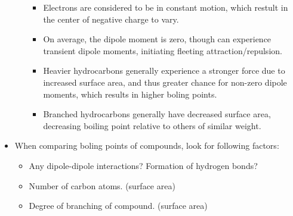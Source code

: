 \documentclass[12pt,a4paper]{article}
\begin{document}
\begin{itemize}
\begin{itemize}
                \begin{itemize}
                    \item Electrons are considered to be in constant motion, which restult in the center of negative charge to vary.
                    \item On average, the dipole moment is zero, though can experience transient dipole moments, initiating fleeting attraction/repulsion.
                    \item Heavier hydrocarbons generally experience a stronger force due to increased surface area, and thus greater chance for non-zero dipole moments, which results in higher boling points.
                    \item Branched hydrocarbons generally have decreased surface area, decreasing boiling point relative to others of similar weight.
                \end{itemize}
        \end{itemize}
    \item When comparing boling points of compounds, look for following factors:
        \begin{itemize}
            \item Any dipole-dipole interactions? Formation of hydrogen bonds?
            \item Number of carbon atoms. (surface area)
            \item Degree of branching of compound. (surface area)
        \end{itemize}
\end{itemize}
\end{document}
